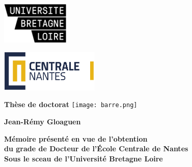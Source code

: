 \documentclass[10pt]{book}
\begin{document}

\newlength{\glarg}
\setlength{\glarg}{14cm}
\newlength{\Glarg}
\setlength{\Glarg}{15cm}

\begin{titlepage}
\thispagestyle{empty}

\vspace{-4cm}

\begin{minipage}{0.35\linewidth}
\includegraphics[height=20mm]{ubl.png}
\end{minipage}
\hfill
\begin{minipage}{0.35\linewidth}
\includegraphics[height=20mm]{logoCN.png}
\end{minipage}

\vspace{0.75cm}

\begin{minipage}{0.5\linewidth}
{\Huge\bfseries \hspace{0.8cm} \color{orange} Th\`ese de doctorat}
\hspace{-0.6cm}
\texttt{[image: barre.png]}
\end{minipage}

\vspace{0.5cm}

\begin{flushright}
{\Huge\bf \color{orange}Jean-R\'emy Gloaguen}
\end{flushright}

\vspace{1.5cm}

\begin{minipage}{\linewidth}
{\large \textbf{Mémoire présenté en vue de l'obtention\\
du grade de Docteur de l'\'Ecole Centrale de Nantes\\
Sous le sceau de l'Université Bretagne Loire}}

\vspace{0.2cm}


\end{minipage}
\end{titlepage}
\end{document}
